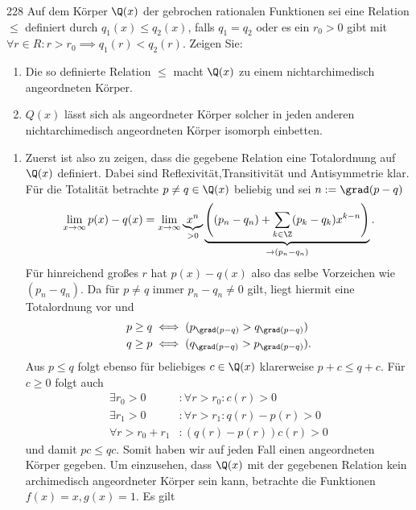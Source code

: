 \begin{algebraUE}{228}
Auf dem Körper $\Q(x)$ der gebrochen rationalen Funktionen sei eine Relation $\leq$
definiert durch $q_1(x) \leq q_2(x)$, falls $q_1 = q_2$ oder es ein $r_0 > 0$ gibt
mit $\forall r \in R: r > r_0 \implies q_1(r) < q_2(r)$. Zeigen Sie:
\begin{enumerate}
  \item Die so definierte Relation $\leq$ macht $\Q(x)$ zu einem nichtarchimedisch
  angeordneten Körper.
  \item $Q(x)$ lässt sich als angeordneter Körper solcher in jeden anderen
  nichtarchimedisch angeordneten Körper isomorph einbetten.
\end{enumerate}
\end{algebraUE}
\begin{solution}
\begin{enumerate}
  \item Zuerst ist also zu zeigen, dass die gegebene Relation eine Totalordnung
  auf $\Q(x)$ definiert.
  Dabei sind Reflexivität,Transitivität und Antisymmetrie klar.
  Für die Totalität betrachte $p \neq q \in \Q(x)$ beliebig und sei $n := \grad(p - q)$
  \begin{align*}
    \lim_{x \to \infty} p(x) - q(x) = \lim_{x \to \infty}\underbrace{x^n}_{> 0}
    \underbrace{\left((p_n - q_n) + \sum_{k \in \Z}(p_k - q_k)x^{k-n}\right)}_{\to (p_n - q_n)}.
  \end{align*}
  Für hinreichend großes $r$ hat $p(x) - q(x)$ also das selbe Vorzeichen wie $(p_n - q_n)$.
  Da für $p \neq q$ immer $p_n - q_n \neq 0$ gilt, liegt hiermit eine Totalordnung vor und
  \begin{align*}
    p \geq q &\iff (p_{\grad(p-q)} > q_{\grad(p-q)}) \\
    q \geq p &\iff (q_{\grad(p-q)} > p_{\grad(p-q)}).
  \end{align*}
  Aus $p \leq q$ folgt ebenso für beliebiges $c \in \Q(x)$ klarerweise $p + c \leq q + c$.
  Für $c \geq 0$ folgt auch
  \begin{align*}
    \exists r_0 > 0&: \forall r > r_0: c(r) > 0 \\
    \exists r_1 > 0&: \forall r > r_1: q(r) - p(r) > 0 \\
    \forall r > r_0 + r_1&: (q(r) - p(r))c(r) > 0
  \end{align*}
  und damit $pc \leq qc$. Somit haben wir auf jeden Fall einen angeordneten Körper
  gegeben.
  Um einzusehen, dass $\Q(x)$ mit der gegebenen Relation kein archimedisch angeordneter
  Körper sein kann, betrachte die Funktionen $f(x) = x, g(x) = 1$. Es gilt

\end{enumerate}
\end{solution}
